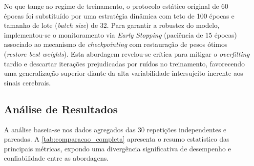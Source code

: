 \documentclass[alpha-refs,brazilian]{CC-EC_TF-TC}
\begin{document}
No que tange ao regime de treinamento, o protocolo estático original de 60 épocas foi substituído por uma estratégia dinâmica com teto de 100 épocas e tamanho de lote (\textit{batch size}) de 32. Para garantir a robustez do modelo, implementou-se o monitoramento via \textit{Early Stopping} (paciência de 15 épocas) associado ao mecanismo de \textit{checkpointing} com restauração de pesos ótimos (\textit{restore best weights}). Esta abordagem revelou-se crítica para mitigar o \textit{overfitting} tardio e descartar iterações prejudicadas por ruídos no treinamento, favorecendo uma generalização superior diante da alta variabilidade intersujeito inerente aos sinais cerebrais.

\subsection{Análise de Resultados}

A análise baseia-se nos dados agregados das 30 repetições independentes e pareadas. A \autoref{tab:comparacao_completa} apresenta o resumo estatístico das principais métricas, expondo uma divergência significativa de desempenho e confiabilidade entre as abordagens.
\end{document}
